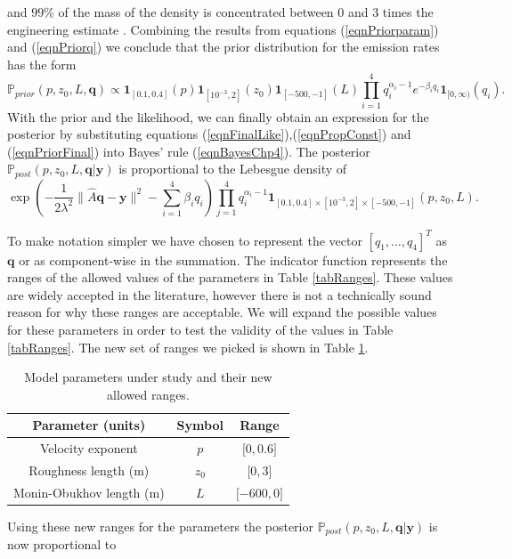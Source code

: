 \documentclass{sfuthesis}
\newcommand{\post}{\mathbb{P}_{post}}
\newcommand{\prior}{\mathbb{P}_{prior}}
\newcommand{\q}{\textbf{q}}
\newcommand{\pars}{p,z_{0},L}
\newcommand{\y}{\textbf{y}}
\begin{document}
and $99\%$ of the mass of the density is concentrated between 0 and 3 times the
engineering estimate \cite{dudley2002real}. 
Combining the results from equations (\ref{eqnPriorparam}) and (\ref{eqnPriorq})
we conclude that the prior distribution  for the emission rates has the form
\begin{equation}\label{eqnPriorFinal}
\prior(p,z_{0},L,\q)\propto \textbf{1}_{[0.1,0.4]}(p)\textbf{1}_{[10^{-3},2]}(z_{0})\textbf{1}_{[-500,-1]}(L)\prod_{i=1}^{4}q_{i}^{\alpha_{i}-1}e^{-\beta_{i} q_{i}}\textbf{1}_{[0,\infty)}(q_{i}).
\end{equation}
With the prior and the likelihood, we can finally obtain an expression for the posterior by substituting  equations (\ref{eqnFinalLike}),(\ref{eqnPropConst}) and (\ref{eqnPriorFinal})
into Bayes' rule (\ref{eqnBayesChp4}). The posterior $\post(\pars,\q|\y)$ is proportional to the Lebesgue density of
\begin{equation*}
\exp\left(-\frac{1}{2\lambda^{2}}\|\widehat{A}\q-\y\|^{2}-\sum_{i=1}^{4}\beta_{i}q_{i}\right)\prod_{j=1}^{4}q_{i}^{\alpha_{i}-1}\textbf{1}_{[0.1,0.4]\times[10^{-3},2]\times[-500,-1]}(p,z_{0},L).
\end{equation*}


To make notation simpler we have chosen to represent the vector $[q_{1},\ldots,q_{4}]^{T}$ as $\q$ 
or as component-wise in the summation. The indicator function represents the ranges of the allowed  values of the parameters in Table \ref{tabRanges}. 
These values are widely accepted in the literature, however there is not
a technically sound reason for why these ranges are acceptable.  We will expand the possible values for  these parameters
in order to test the validity of the values in Table \ref{tabRanges}. The new set of ranges we picked is shown
in Table \ref{tabNewRanges}.


\begin{table}[H]
\centering
\begin{tabular}{|c|c|c|}
\hline 
Parameter (units) & Symbol & Range\tabularnewline
\hline 
\hline 
Velocity exponent  & $p$ & ${[}0,0.6{]}$\tabularnewline
\hline 
Roughness length (m) & $z_{0}$ & ${[}0 ,3{]}$\tabularnewline
\hline 
Monin-Obukhov length (m) & $L$ & ${[}-600,0{]}$\tabularnewline
\hline 
\end{tabular}
\caption{Model parameters under study and their new allowed ranges.}
\label{tabNewRanges}
\end{table}
Using these new ranges for the parameters the posterior $\post(\pars,\q|\y)$ is now proportional to
\end{document}

